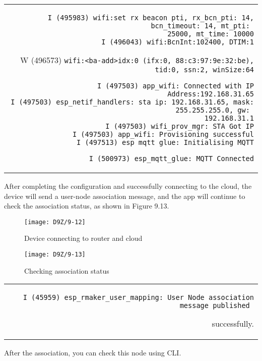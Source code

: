 \documentclass[a4paper,12pt]{book}
\begin{document}
\begin{codebloc}
\begin{tabular}{d}
\vspace{2pt}
\begin{verbatim}
I (495983) wifi:set rx beacon pti, rx_bcn_pti: 14, bcn_timeout: 14, mt_pti: 
25000, mt_time: 10000
I (496043) wifi:BcnInt:102400, DTIM:1
\end{verbatim}
W (496573) \fontsize{9.5pt}{10pt}\selectfont\verb|wifi:<ba-add>idx:0 (ifx:0, 88:c3:97:9e:32:be), tid:0, ssn:2, winSize:64|
\footnotesize
\begin{verbatim}
I (497503) app_wifi: Connected with IP Address:192.168.31.65
I (497503) esp_netif_handlers: sta ip: 192.168.31.65, mask: 255.255.255.0, gw: 
192.168.31.1
I (497503) wifi_prov_mgr: STA Got IP
I (497503) app_wifi: Provisioning successful
I (497513) esp_mqtt_glue: Initialising MQTT
\end{verbatim}
\verb|I (500973) esp_mqtt_glue: MQTT Connected|
\end{tabular}
\end{codebloc}

After completing the configuration and successfully connecting to the cloud, the device will send a user-node association message, and the app will continue to check the association status, as shown in Figure 9.13.

\begin{figure}[!h]
  \Centering
  \begin{minipage}[b]{0.45\textwidth}
    \texttt{[image: D9Z/9-12]}
    \caption{\Centering\newline Device connecting to router and cloud}
  \end{minipage}
  \begin{minipage}[b]{0.45\textwidth}
    \texttt{[image: D9Z/9-13]}
    \caption{\Centering\newline Checking association status}
  \end{minipage}
\end{figure}

\begin{codebloc}
\begin{tabular}{d}
\fontsize{10.5pt}{10.5pt}\selectfont
\verb|I (45959) esp_rmaker_user_mapping: User Node association message published |

successfully.
\end{tabular}
\end{codebloc}

After the association, you can check this node using CLI.
\end{document}
